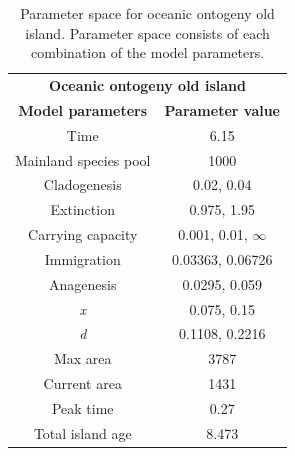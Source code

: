\begin{table}[h]
    \centering
    \caption{Parameter space for oceanic ontogeny old island. Parameter space consists of each combination of the model parameters.}
    \begin{tabular}{ c | c }
        \multicolumn{2}{c}{\textbf{Oceanic ontogeny old island}} \\
        \textbf{Model parameters} & \textbf{Parameter value} \\ 
        \hline
        \hline
        Time & 6.15 \\
        \hline
        Mainland species pool & 1000 \\
        \hline
        Cladogenesis & 0.02, 0.04 \\
        \hline
        Extinction & 0.975, 1.95 \\
        \hline
        Carrying capacity & 0.001, 0.01, $\infty$ \\
        \hline
        Immigration & 0.03363, 0.06726 \\
        \hline
        Anagenesis & 0.0295, 0.059 \\
        \hline
        \textit{x} & 0.075, 0.15 \\
        \hline
        \textit{d} & 0.1108, 0.2216 \\
        \hline
        Max area & 3787 \\
        \hline
        Current area & 1431 \\
        \hline
        Peak time & 0.27 \\
        \hline
        Total island age & 8.473 \\
    \end{tabular}
    \label{tab:oceanic_ontogeny_old}
\end{table}

